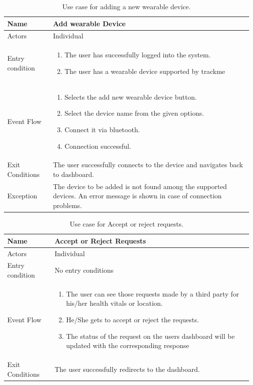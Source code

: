 \begin{table}[H]
\begin{tabular}{| l | p{} |}
\hline
Name & Add wearable Device\\
\hline
Actors & Individual\\
\hline
Entry condition & \begin{enumerate}
  \item The user has successfully logged into the system.
  \item The user has a wearable device supported by trackme
\end{enumerate}  \\
\hline
Event Flow & \begin{enumerate}
  \item Selects the add new wearable device button.
  \item Select the device name from the given options.
  \item Connect it via bluetooth.
  \item Connection successful.
\end{enumerate}
\\
\hline
Exit Conditions & The user successfully connects to the device and navigates back to dashboard. \\
\hline
Exception & 
The device to be added is not found among the supported devices. An error message is shown in case of connection problems.\\
\hline
\end{tabular}
\caption{Use case for adding a new wearable device.}
\label{usecase-adddevice}
\end{table}



\begin{table}[H]
\begin{tabular}{| l | p{} |}
\hline
Name & Accept or Reject Requests\\
\hline
Actors & Individual\\
\hline
Entry condition & No entry conditions\\
\hline
Event Flow & \begin{enumerate}
\item The user can see those requests made by a third party for his/her health vitals or location.
\item He/She gets to accept or reject the requests.
\item The status of the request on the users dashboard will be updated with the corresponding response
\end{enumerate}
\\
\hline
Exit Conditions & The user successfully redirects to the dashboard.\\
\hline
\end{tabular}
\caption{Use case for Accept or reject requests.}
\label{usecase-accorrejrequests}
\end{table}

